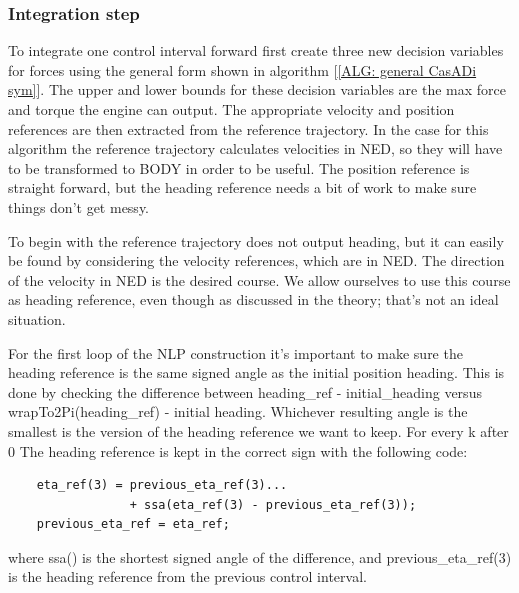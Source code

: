 \subsubsection*{Integration step} \label{CHAP: integration step}
To integrate one control interval forward first create three new decision variables for forces using the general form
shown in algorithm [\ref{ALG: general CasADi sym}]. The upper and lower bounds for these decision variables are the max force and torque
the engine can output. The appropriate velocity and position references are then extracted from the reference trajectory. In the case
for this algorithm the reference trajectory calculates velocities in NED, so they will have to be transformed to BODY in order to be useful.
The position reference is straight forward, but the heading reference needs a bit of work to make sure things don't get messy.

To begin with the reference trajectory does not output heading, but it can easily be found by considering the velocity references, which are in NED.
The direction of the velocity in NED is the desired course. We allow ourselves to use this course as heading reference, even though as discussed in the theory;
that's not an ideal situation.

For the first loop of the \gls{NLP} construction it's important to make sure the heading reference is the same signed angle as the initial position heading.
This is done by checking the difference between heading\_ref - initial\_heading versus wrapTo2Pi(heading\_ref) - initial heading. Whichever resulting angle is the smallest
is the version of the heading reference we want to keep. For every k after 0 The heading reference is kept in the correct sign with the following code:
\begin{lstlisting}
    eta_ref(3) = previous_eta_ref(3)...
                 + ssa(eta_ref(3) - previous_eta_ref(3));
    previous_eta_ref = eta_ref; 
\end{lstlisting}
where ssa() is the shortest signed angle of the difference, and previous\_eta\_ref(3) is the heading reference from the previous control interval.


